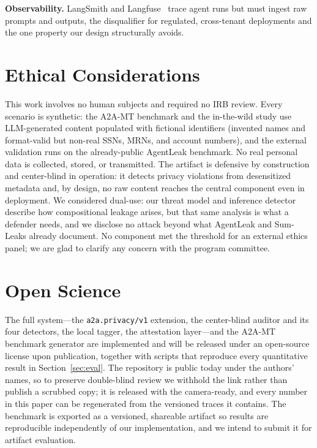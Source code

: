 \documentclass[conference,compsoc]{IEEEtran}
\newcommand{\ext}{\texttt{a2a.privacy/v1}}
\begin{document}
\noindent\textbf{Observability.} LangSmith and Langfuse~\cite{langfuse} trace
agent runs but must ingest raw prompts and outputs, the disqualifier for
regulated, cross-tenant deployments and the one property our design structurally
avoids.

\section*{Ethical Considerations}
This work involves no human subjects and required no IRB review. Every scenario is
synthetic: the A2A-MT benchmark and the in-the-wild study use LLM-generated content
populated with fictional identifiers (invented names and format-valid but
non-real SSNs, MRNs, and account numbers), and the external validation runs on the
already-public AgentLeak benchmark. No real personal data is collected, stored, or
transmitted. The artifact is defensive by construction and center-blind in
operation: it detects privacy violations from desensitized metadata and, by design,
no raw content reaches the central component even in deployment. We considered
dual-use: our threat model and inference detector describe how compositional
leakage arises, but that same analysis is what a defender needs, and we disclose no
attack beyond what AgentLeak and Sum-Leaks already document. No component met the
threshold for an external ethics panel; we are glad to clarify any concern with the
program committee.

\section*{Open Science}
The full system---the \ext{} extension, the center-blind auditor and its four
detectors, the local tagger, the attestation layer---and the A2A-MT benchmark
generator are implemented and will be released under an open-source license upon
publication, together with scripts that reproduce every quantitative result in
Section~\ref{sec:eval}. The repository is public today under the authors' names, so to preserve double-blind review we withhold the link rather than publish a scrubbed copy; it is released with the camera-ready, and every number in this paper can be regenerated from the versioned traces it contains. The benchmark is exported as a versioned, shareable artifact so results are
reproducible independently of our implementation, and we intend to submit it for
artifact evaluation.
\end{document}
